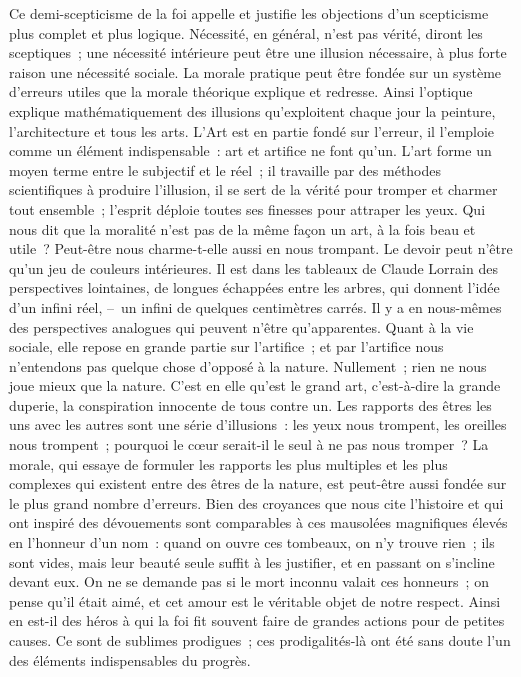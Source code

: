\documentclass[french,twoside]{book} %
\begin{document}
Ce demi-scepticisme de la foi appelle et justifie les objections d’un scepticisme plus complet et plus logique. Nécessité, en général, n’est pas vérité, diront les sceptiques ; une nécessité intérieure peut être une illusion nécessaire, à plus forte raison une nécessité sociale. La morale pratique peut être fondée sur un système d’erreurs utiles que la morale théorique explique et redresse. Ainsi l’optique explique mathématiquement des illusions qu’exploitent chaque jour la peinture, l’architecture et tous les arts. L’Art est en partie fondé sur l’erreur, il l’emploie comme un élément indispensable : art et artifice ne font qu’un. L’art forme un moyen terme entre le subjectif et le réel ; il travaille par des méthodes scientifiques à produire l’illusion, il se sert de la vérité pour tromper et charmer tout ensemble ; l’esprit déploie toutes ses finesses pour attraper les yeux. Qui nous dit que la moralité n’est pas de la même façon un art, à la fois beau et utile ? Peut-être nous charme-t-elle aussi en nous trompant. Le devoir peut n’être qu’un jeu de couleurs intérieures. Il est dans les tableaux de Claude Lorrain des perspectives lointaines, de longues échappées entre les arbres, qui donnent l’idée d’un infini réel, – un infini de quelques centimètres carrés. Il y a en nous-mêmes des perspectives analogues qui peuvent n’être qu’apparentes. Quant à la vie sociale, elle repose en grande partie sur l’artifice ; et par l’artifice nous n’entendons pas quelque chose d’opposé à la nature. Nullement ; rien ne nous joue mieux que la nature. C’est en elle qu’est le grand art, c’est-à-dire la grande duperie, la conspiration innocente de tous contre un. Les rapports des êtres les uns avec les autres sont une série d’illusions : les yeux nous trompent, les oreilles nous trompent ; pourquoi le cœur serait-il le seul à ne pas nous tromper ? La morale, qui essaye de formuler les rapports les plus multiples et les plus complexes qui existent entre des êtres de la nature, est peut-être aussi fondée sur le plus grand nombre d’erreurs. Bien des croyances que nous cite l’histoire et qui ont inspiré des dévouements sont comparables à ces mausolées magnifiques élevés en l’honneur d’un nom : quand on ouvre ces tombeaux, on n’y trouve rien ; ils sont vides, mais leur beauté seule suffit à les justifier, et en passant on s’incline devant eux. On ne se demande pas si le mort inconnu valait ces honneurs ; on pense qu’il était aimé, et cet amour est le véritable objet de notre respect. Ainsi en est-il des héros à qui la foi fit souvent faire de grandes actions pour de petites causes. Ce sont de sublimes prodigues ; ces prodigalités-là ont été sans doute l’un des éléments indispensables du progrès.\par
\end{document}
